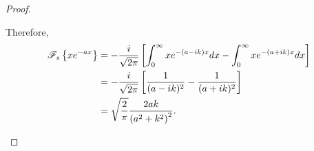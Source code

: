 \begin{proof}
\begin{enumerate}
      Therefore,
      \begin{align*}
        \mathscr{F}_s\left\{ {xe^{-ax}} \right\} &= -\frac{i}{\sqrt{2\pi}}\left[\int_0^\infty x e^{-(a-ik)x}dx - \int_0^\infty x e^{-(a+ik)x}dx\right] \\
        &= -\frac{i}{\sqrt{2\pi}}\left[\frac{1}{(a-ik)^2} - \frac{1}{(a+ik)^2}\right] \\
        &= \sqrt{\frac{2}{\pi}}\frac{2 ak}{\left(a^2 + k^2\right)^2}.
      \end{align*}
  \end{enumerate}

\end{proof}
\newpage
